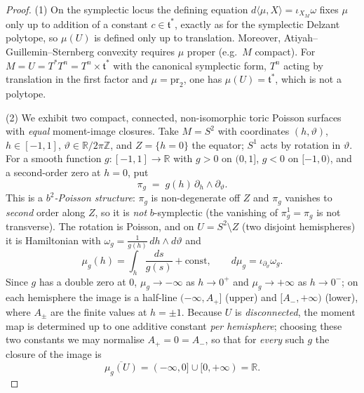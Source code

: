 \documentclass{amsart}
\theoremstyle{definition}
\begin{document}
\begin{proof}
(1) On the symplectic locus the defining equation
$d\langle\mu,X\rangle=\iota_{X_M}\omega$ fixes $\mu$ only up to addition of a
constant $c\in\mathfrak t^*$, exactly as for the symplectic Delzant polytope, so
$\mu(U)$ is defined only up to translation. Moreover, Atiyah--Guillemin--Sternberg
convexity requires $\mu$ proper (e.g.\ $M$ compact). For
$M=U=T^*T^n=T^n\times\mathfrak t^*$ with the canonical symplectic form, $T^n$
acting by translation in the first factor and $\mu=\mathrm{pr}_2$, one has
$\mu(U)=\mathfrak t^*$, which is not a polytope.

(2) We exhibit two compact, connected, non-isomorphic toric Poisson surfaces with
\emph{equal} moment-image closures. Take $M=S^2$ with coordinates
$(h,\vartheta)$, $h\in[-1,1]$, $\vartheta\in\mathbb R/2\pi\mathbb Z$, and
$Z=\{h=0\}$ the equator; $S^1$ acts by rotation in $\vartheta$. For a smooth
function $g\colon[-1,1]\to\mathbb R$ with $g>0$ on $(0,1]$, $g<0$ on $[-1,0)$,
and a second-order zero at $h=0$, put
\[
\pi_g \;=\; g(h)\,\partial_h\wedge\partial_\vartheta .
\]
This is a \emph{$b^2$-Poisson structure}: $\pi_g$ is non-degenerate off $Z$ and
$\pi_g$ vanishes to \emph{second} order along $Z$, so it is \emph{not}
$b$-symplectic (the vanishing of $\pi_g^{1}=\pi_g$ is not transverse). The
rotation is Poisson, and on $U=S^2\setminus Z$ (two disjoint hemispheres) it is
Hamiltonian with $\omega_g=\tfrac{1}{g(h)}\,dh\wedge d\vartheta$ and
\[
\mu_g(h)=\int_{h}\frac{ds}{g(s)}+\text{const},\qquad
d\mu_g=\iota_{\partial_\vartheta}\omega_g .
\]
Since $g$ has a double zero at $0$, $\mu_g\to-\infty$ as $h\to0^+$ and
$\mu_g\to+\infty$ as $h\to0^-$; on each hemisphere the image is a half-line
$(-\infty,A_+]$ (upper) and $[A_-,+\infty)$ (lower), where $A_\pm$ are the
finite values at $h=\pm1$. Because $U$ is \emph{disconnected}, the moment map is
determined up to one additive constant \emph{per hemisphere}; choosing these two
constants we may normalise $A_+=0=A_-$, so that for \emph{every} such $g$ the
closure of the image is
\[
\overline{\mu_g(U)}=(-\infty,0]\cup[0,+\infty)=\mathbb R .
\]


\end{proof}
\end{document}
